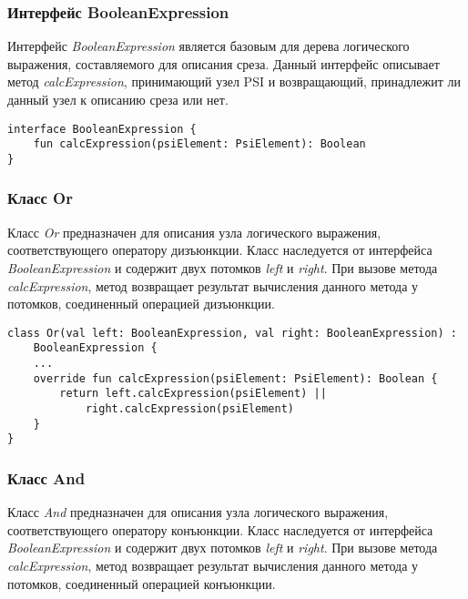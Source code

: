 \subsubsection{Интерфейс BooleanExpression}
\label{ssub:BooleanExpression}
Интерфейс \textit{BooleanExpression} является базовым для дерева логического
выражения, составляемого для описания среза.
Данный интерфейс описывает метод \textit{calcExpression}, принимающий узел PSI и возвращающий, принадлежит ли данный узел к описанию среза или нет.

\begin{lstlisting}[style={java}, label={lst:BooleanExpression},
  caption={Интерфейс BooleanExpression}]
interface BooleanExpression {
    fun calcExpression(psiElement: PsiElement): Boolean
}
\end{lstlisting}
\subsubsection{Класс Or}
\label{ssub:Or}
Класс \textit{Or} предназначен для описания узла логического выражения,
соответствующего оператору дизъюнкции.
Класс наследуется от интерфейса \textit{BooleanExpression} и содержит двух
потомков \textit{left} и \textit{right}.
При вызове метода \textit{calcExpression}, метод возвращает результат вычисления
данного метода у потомков, соединенный операцией дизъюнкции.

\begin{lstlisting}[style={java}, label={lst:Or},
  caption={Класс Or}]
class Or(val left: BooleanExpression, val right: BooleanExpression) :
	BooleanExpression {
	...
    override fun calcExpression(psiElement: PsiElement): Boolean {
        return left.calcExpression(psiElement) ||
        	right.calcExpression(psiElement)
    }
}
\end{lstlisting}
\subsubsection{Класс And}
\label{ssub:And}
Класс \textit{And} предназначен для описания узла логического выражения,
соответствующего оператору конъюнкции.
Класс наследуется от интерфейса \textit{BooleanExpression} и содержит двух
потомков \textit{left} и \textit{right}.
При вызове метода \textit{calcExpression}, метод возвращает результат вычисления
данного метода у потомков, соединенный операцией конъюнкции.


